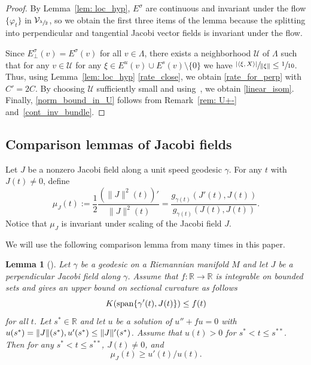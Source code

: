 \documentclass[10pt]{amsart}
\newtheorem{lemma}[theorem]{Lemma}
\theoremstyle{definition}
\newcommand{\field}[1]{\mathbb{#1}}
\newcommand{\R}{\field{R}}
\let\phi\varphi
\renewcommand{\>}{{\rangle}}
\newcommand{\<}{{\langle}}
\begin{document}
\begin{proof}
By Lemma~\ref{lem: loc_hyp}, $E^{\sigma}$ are continuous and invariant under the flow $\{\phi_t\}$ in $\mathcal V_{\sfrac{\lambda}{2}}$, so we obtain the first three items of the lemma because the splitting into perpendicular and tangential Jacobi vector fields is invariant under the flow.

Since $E^{\sigma}_{\bot}(v)=E^{\sigma}(v)$ for all $v\in\Lambda$, there exists a neighborhood $\mathcal U$ of $\Lambda$ such that for any $v\in\mathcal U$ for any $\xi\in E^u(v)\cup E^s(v)\setminus\{0\}$ we have $\sfrac{|\<\xi,X\>|}{\|\xi\|}\leq \sfrac{1}{10}$. Thus, using Lemma~\ref{lem: loc_hyp} \eqref{rate_close}, we obtain \eqref{rate_for_perp} with $C'=2C$. By choosing $\mathcal U$ sufficiently small and using~\cite[Prop.\,2.6]{E73}, we obtain \eqref{linear_isom}.
Finally, \eqref{norm_bound_in_U} follows from Remark~\ref{rem: U+-} and~\eqref{cont_inv_bundle}.
\end{proof}

\subsection{Comparison lemmas of Jacobi fields}
Let $J$ be a nonzero Jacobi field along a unit speed geodesic $\gamma$. For any $t$ with $J(t)\neq 0$, define
\begin{equation}\label{def: mu}
\mu_J(t):= \frac{1}{2}\frac{\left(\|J\|^2(t)\right)'}{\|J\|^2(t)}=\frac{g_{\gamma(t)}(J'(t), J(t))}{g_{\gamma(t)}(J(t), J(t))}.
\end{equation}
Notice that $\mu_J$ is invariant under scaling of the Jacobi field $J$.

We will use the following comparison lemma from \cite{G75} many times in this paper.
\begin{lemma}[{\cite[Lem.\,3]{G75}}]\label{lem: comp_thm}
Let $\gamma$ be a geodesic on a Riemannian manifold $M$ and let $J$ be a perpendicular Jacobi field along $\gamma$. Assume that $f\colon\mathbb{R}\to\mathbb{R}$ is integrable on bounded sets and gives an upper bound on sectional curvature as follows
\[
K(\textup{span}\{\gamma'(t), J(t)\})\leq f(t)
\] for all $t$. Let $s^*\in\R$ and let $u$ be a solution of $u''+fu=0$ with $u(s^*)=\|J\|(s^*), u'(s^*)\\ \leq \|J\|'(s^*)$. Assume that $u(t)>0$ for $s^*<t\leq s^{**}$. Then for any $s^*<t\leq s^{**}$, $J(t)\neq 0$, and
\[
\mu_J(t)\geq u'(t)/u(t).
\]
\end{lemma}
\end{document}
